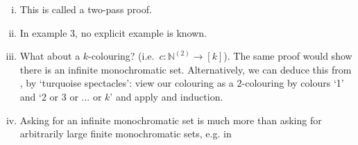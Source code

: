 \documentclass{article}
\begin{document}
\begin{remark}\leavevmode
  \begin{enumerate}[(i)]
    \item This is called a two-pass proof.
    \item In example 3, no explicit example is known.
    \item What about a $k$-colouring? (i.e.\ $c: \mathbb{N}^{(2)} \to [k]$). The same proof would show there is an infinite monochromatic set.
      Alternatively, we can deduce this from , by `turquoise spectacles': view our colouring as a $2$-colouring by colours `1' and `2 or 3 or ... or $k$' and apply  and induction.
    \item Asking for an infinite monochromatic set is much more than asking for arbitrarily large finite monochromatic sets, e.g. in
      \begin{center}
\end{center}
\end{enumerate}
\end{remark}
\end{document}
